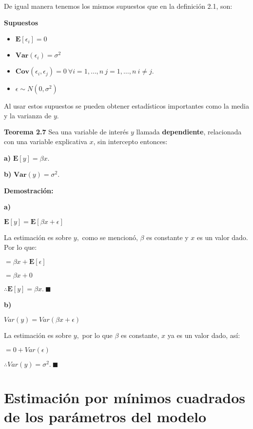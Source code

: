 \documentclass[
  a4paper,
  oneside,
  openany]{book}
\begin{document}
De igual manera tenemos los mismos supuestos que en la definición 2.1, son:

\textbf{Supuestos}

\begin{itemize}
\item
  \(\mathbf{E}[\epsilon_{i}]=0\)
\item
  \(\textbf{Var}(\epsilon_{i})=\sigma^2\)
\item
  \(\textbf{Cov}(\epsilon_{i},\epsilon_{j})= 0 \ \forall i = 1, \ldots, n \ j=1, \ldots, n \ i \neq j.\)
\item
  \(\epsilon \sim N(0,\sigma^2)\)
\end{itemize}

Al usar estos supuestos se pueden obtener estadísticos importantes como la
media y la varianza de \(y\).

\textbf{Teorema 2.7} Sea una variable de interés \(y\) llamada \textbf{dependiente}, relacionada con una variable explicativa \(x\), sin intercepto entonces:

\textbf{a)} \(\mathbf{E}[y]=\beta x.\)

\textbf{b)} \(\textbf{Var}(y)=\sigma^2.\)

\textbf{Demostración:}

\textbf{a)}

\(\mathbf{E}[y]=\mathbf{E}[\beta x + \epsilon]\)

La estimación es sobre \(y,\) como se mencionó, \(\beta\) es constante y \(x\) es un valor dado. Por lo que:

\(=\beta x + \mathbf{E}[\epsilon]\)

\(=\beta x + 0\)

\(\therefore \mathbf{E}[y]= \beta x. \ \blacksquare\)

\textbf{b)}

\(Var(y)=Var(\beta x + \epsilon)\)

La estimación es sobre \(y,\) por lo que \(\beta\) es constante, \(x\) ya es un valor dado, así:

\(=0+Var(\epsilon)\)

\(\therefore Var(y)=\sigma^2.\ \blacksquare\)

\hypertarget{estimaciuxf3n-por-muxednimos-cuadrados-de-los-paruxe1metros-del-modelo-1}{%
\section{Estimación por mínimos cuadrados de los parámetros del modelo}\label{estimaciuxf3n-por-muxednimos-cuadrados-de-los-paruxe1metros-del-modelo-1}}
\end{document}
